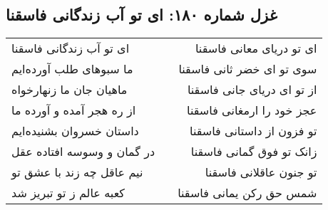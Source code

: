 \begin{center}
\section*{غزل شماره ۱۸۰: ای تو آب زندگانی فاسقنا}
\label{sec:0180}
\begin{longtable}{l p{0.5cm} r}
ای تو آب زندگانی فاسقنا
&&
ای تو دریای معانی فاسقنا
\\
ما سبوهای طلب آورده‌ایم
&&
سوی تو ای خضر ثانی فاسقنا
\\
ماهیان جان ما زنهارخواه
&&
از تو ای دریای جانی فاسقنا
\\
از ره هجر آمده و آورده ما
&&
عجز خود را ارمغانی فاسقنا
\\
داستان خسروان بشنیده‌ایم
&&
تو فزون از داستانی فاسقنا
\\
در گمان و وسوسه افتاده عقل
&&
زانک تو فوق گمانی فاسقنا
\\
نیم عاقل چه زند با عشق تو
&&
تو جنون عاقلانی فاسقنا
\\
کعبه عالم ز تو تبریز شد
&&
شمس حق رکن یمانی فاسقنا
\\
\end{longtable}
\end{center}
